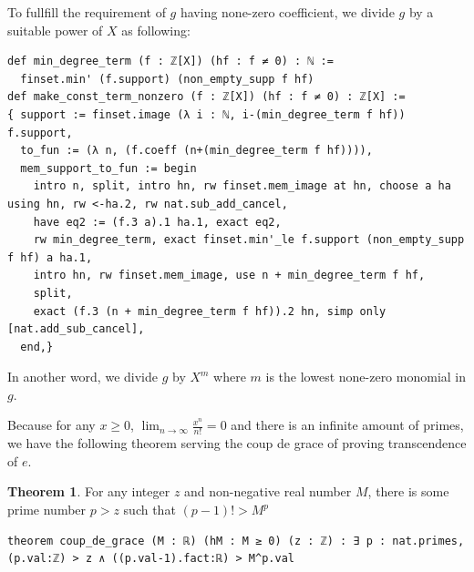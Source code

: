 \documentclass{report}
\theoremstyle{definition}
\newtheorem{theorem}{Theorem}[section]
\newenvironment{code}{\captionsetup{type=listing}}{}
\begin{document}
To fullfill the requirement of $g$ having none-zero coefficient, we divide $g$ by a suitable power of $X$ as following:
\begin{code}
\begin{verbatim}
def min_degree_term (f : ℤ[X]) (hf : f ≠ 0) : ℕ := 
  finset.min' (f.support) (non_empty_supp f hf)
def make_const_term_nonzero (f : ℤ[X]) (hf : f ≠ 0) : ℤ[X] := 
{ support := finset.image (λ i : ℕ, i-(min_degree_term f hf)) f.support,
  to_fun := (λ n, (f.coeff (n+(min_degree_term f hf)))),
  mem_support_to_fun := begin
    intro n, split, intro hn, rw finset.mem_image at hn, choose a ha using hn, rw <-ha.2, rw nat.sub_add_cancel,
    have eq2 := (f.3 a).1 ha.1, exact eq2,
    rw min_degree_term, exact finset.min'_le f.support (non_empty_supp f hf) a ha.1,
    intro hn, rw finset.mem_image, use n + min_degree_term f hf,
    split,
    exact (f.3 (n + min_degree_term f hf)).2 hn, simp only [nat.add_sub_cancel],
  end,}
\end{verbatim}

In another word, we divide $g$ by $X^m$ where $m$ is the lowest none-zero monomial in $g$.
\end{code}

Because for any $x\ge 0$, $\lim_{n\to\infty}\frac{x^n}{n!}=0$ and there is an infinite amount of primes, we have the following theorem serving the coup de grace of proving transcendence of $e$.
\begin{theorem}
For any integer $z$ and non-negative real number $M$, there is some prime number $p>z$ such that $(p-1)!>M^p$
\begin{verbatim}
theorem coup_de_grace (M : ℝ) (hM : M ≥ 0) (z : ℤ) : ∃ p : nat.primes, (p.val:ℤ) > z ∧ ((p.val-1).fact:ℝ) > M^p.val
\end{verbatim} 
\end{theorem}
\end{document}
